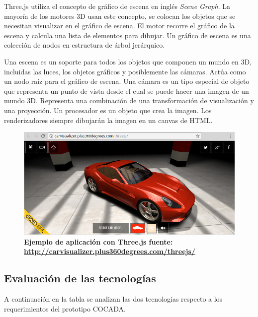 Three.js utiliza el concepto de gráfico de escena en inglés \textit{Scene Graph}. La mayoría de los motores 3D usan este concepto, se colocan los objetos que se necesitan visualizar en el gráfico de escena. El motor recorre el gráfico de la escena y calcula una lista de elementos para dibujar. Un gráfico de escena es una colección de nodos en estructura de árbol jerárquico.

Una escena es un soporte para todos los objetos que componen un mundo en 3D, incluidas las luces, los objetos gráficos y posiblemente las cámaras. Actúa como un nodo raíz para el gráfico de escena. Una cámara es un tipo especial de objeto que representa un punto de vista desde el cual se puede hacer una imagen de un mundo 3D. Representa una combinación de una transformación de visualización y una proyección. Un procesador es un objeto que crea la imagen. Los renderizadores siempre dibujarán la imagen en un canvas de HTML.

\begin{figure}[h]
\includegraphics[width=15cm]{Img/WEB/web-three.jpg}
\centering
\caption{\textbf{\footnotesize{Ejemplo de aplicación con Three.js fuente: \url{http://carvisualizer.plus360degrees.com/threejs/} }}}
\label{fig:jopen}
\end{figure}

\clearpage
\subsection{Evaluación de las tecnologías }

A continuación en la tabla se analizan las dos tecnologías respecto a los requerimientos del prototipo COCADA.

